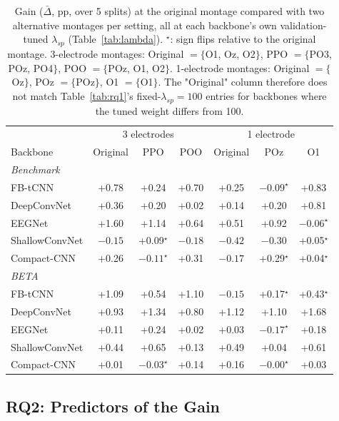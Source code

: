 \documentclass[11pt,a4paper,twoside,asymmetric]{article}
\begin{document}
\begin{table}[htbp]
\caption{Gain ($\bar\Delta$, pp, over 5 splits) at the original montage compared with two alternative montages per setting, all at each backbone's own validation-tuned $\lambda_{sp}$ (Table~\ref{tab:lambda}). $^\star$: sign flips relative to the original montage. 3-electrode montages: Original $=\{$O1, Oz, O2$\}$, PPO $=\{$PO3, POz, PO4$\}$, POO $=\{$POz, O1, O2$\}$. 1-electrode montages: Original $=\{$Oz$\}$, POz $=\{$POz$\}$, O1 $=\{$O1$\}$. The "Original" column therefore does not match Table~\ref{tab:rq1}'s fixed-$\lambda_{sp}=100$ entries for backbones where the tuned weight differs from 100.}
\label{tab:rq1b}
\begin{center}
\footnotesize
\begin{tabular}{lcccccc}
\toprule
 & \multicolumn{3}{c}{3 electrodes} & \multicolumn{3}{c}{1 electrode} \\
Backbone & Original & PPO & POO & Original & POz & O1 \\
\midrule
\multicolumn{7}{l}{\textit{Benchmark}} \\
FB-tCNN & +0.78 & +0.24 & +0.70 & +0.25 & $-0.09^\star$ & +0.83 \\
DeepConvNet & +0.36 & +0.20 & +0.02 & +0.14 & +0.20 & +0.81 \\
EEGNet & +1.60 & +1.14 & +0.64 & +0.51 & +0.92 & $-0.06^\star$ \\
ShallowConvNet & $-0.15$ & +0.09$^\star$ & $-0.18$ & $-0.42$ & $-0.30$ & +0.05$^\star$ \\
Compact-CNN & +0.26 & $-0.11^\star$ & +0.31 & $-0.17$ & +0.29$^\star$ & +0.04$^\star$ \\
\multicolumn{7}{l}{\textit{BETA}} \\
FB-tCNN & +1.09 & +0.54 & +1.10 & $-0.15$ & +0.17$^\star$ & +0.43$^\star$ \\
DeepConvNet & +0.93 & +1.34 & +0.80 & +1.12 & +1.10 & +1.68 \\
EEGNet & +0.11 & +0.24 & +0.02 & +0.03 & $-0.17^\star$ & +0.18 \\
ShallowConvNet & +0.44 & +0.65 & +0.13 & +0.49 & +0.04 & +0.61 \\
Compact-CNN & +0.01 & $-0.03^\star$ & +0.14 & +0.16 & $-0.00^\star$ & +0.03 \\
\bottomrule
\end{tabular}
\end{center}
\end{table}

\subsection{RQ2: Predictors of the Gain}
\label{sec:rq2}
\end{document}
